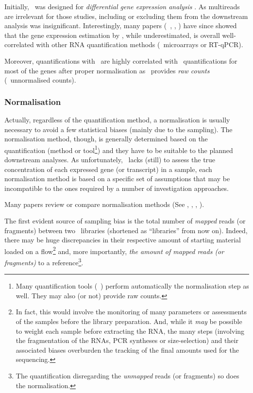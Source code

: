 Initially, \htseq\ was designed for \emph{differential gene
expression analysis} . As multireads are irrelevant for
those studies, including or excluding them from the downstream analysis was
insignificant. Interestingly, many papers (\eg\ \cite{Fonseca2014},
\cite{errorsRNAquant}, \cite{tophatStarwhatever}) have since showed that
the gene expression estimation by \htseq, while underestimated, is overall
well-correlated with other \gls{RNA} quantification methods
(\eg\ microarrays or \gls{RT-qPCR}).

Moreover, quantifications with \htseq\ are highly correlated with \cuffl\
quantifications for most of the genes after proper normalisation
\mycite{tophatStarwhatever} as \htseq\ provides \emph{raw counts} (\ie\
unnormalised counts).


\subsubsection{Normalisation}\label{subsub:norm}
Actually, regardless of the quantification method, a normalisation is usually
necessary to avoid a few statistical biases (mainly due to the sampling). The
normalisation method, though, is generally determined based on the quantification
(method or tool\footnote{Many quantification tools (\eg\ \cuffl) perform
automatically the normalisation step as well. They may also (or not) provide
raw counts.}) and they have to be suitable to the planned downstream analyses.
As unfortunately, \Rnaseq\ lacks (still) to assess the true concentration of each
expressed gene (or transcript) in a sample, each normalisation method is based on
a specific set of assumptions that may be incompatible to the ones required by
a number of investigation approaches.

Many papers review or compare normalisation methods (See \cite{Dillies2013},
\cite{normSigCancerHelp}, \cite{NormImpact}, \cite{ruvseqComQN}).

\minisec{RPKM and FPKM}
The first evident source of sampling bias is the total number of \emph{mapped}
reads (or fragments) between two \Rnaseq\ libraries (shortened as
\enquote{libraries} from now on). Indeed, there may be huge discrepancies in
their respective amount of starting material loaded on a
\gls{flow}\footnote{In fact, this would involve the monitoring of many parameters
or assessments of the samples before the library preparation. And, while
it \emph{may} be possible to weight each sample before extracting the \gls{RNA},
the many steps (involving the fragmentation of the \glspl{RNA},
\gls{PCR} syntheses or size-selection) and their associated biases
overburden the tracking of the final amounts used for the sequencing.}
and, more importantly, \emph{the amount of mapped reads (or
fragments)} to a reference\footnote{The quantification disregarding the
\emph{unmapped} reads (or fragments) so does the normalisation.}.

